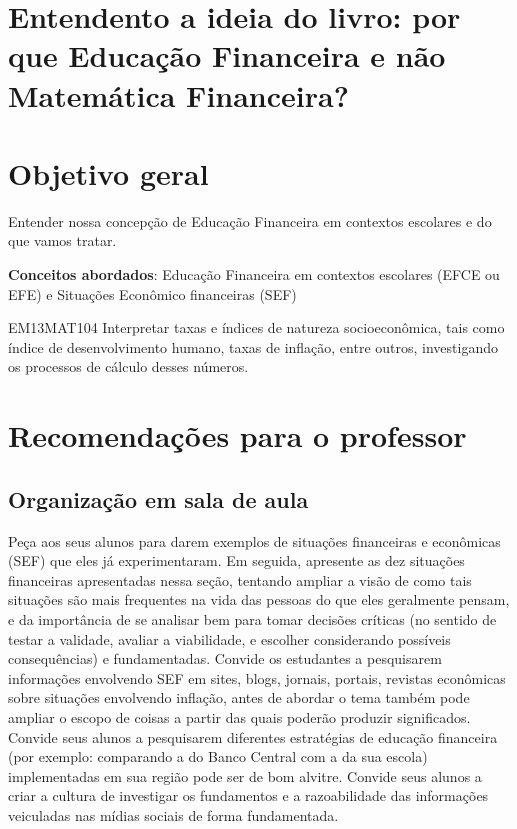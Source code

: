 \begin{apresentacao}
\section*{Entendento a ideia do livro: por que Educação Financeira e não Matemática Financeira?}

\section*{Objetivo geral}

Entender nossa concepção de Educação Financeira em contextos escolares e do que vamos tratar.

\textbf{Conceitos abordados}: Educação Financeira em contextos escolares (EFCE ou EFE) e Situações Econômico financeiras (SEF)

\begin{habilities}{EM13MAT104}
Interpretar taxas e índices de natureza socioeconômica, tais como índice de desenvolvimento humano, taxas de inflação, entre outros, investigando os processos de cálculo desses números.
\end{habilities}

\section{Recomendações para o professor}

\subsection{Organização em sala de aula} Peça aos seus alunos para darem exemplos de situações financeiras e econômicas (SEF) que eles já experimentaram. Em seguida, apresente as dez situações financeiras apresentadas nessa seção, tentando ampliar a visão de como tais situações são mais frequentes na vida das pessoas do que eles geralmente pensam, e da importância de se analisar bem para tomar decisões críticas (no sentido de testar a validade, avaliar a viabilidade, e escolher considerando possíveis consequências) e fundamentadas. Convide os estudantes a pesquisarem informações envolvendo SEF em sites, blogs, jornais, portais, revistas econômicas sobre situações envolvendo inflação, antes de abordar o tema também pode ampliar o escopo de coisas a partir das quais poderão produzir significados. Convide seus alunos a pesquisarem diferentes estratégias de educação financeira (por exemplo: comparando a do Banco Central com a da sua escola) implementadas em sua região pode ser de bom alvitre. Convide seus alunos a criar a cultura de investigar os fundamentos e a razoabilidade das informações veiculadas nas mídias sociais de forma fundamentada.


\end{apresentacao}
